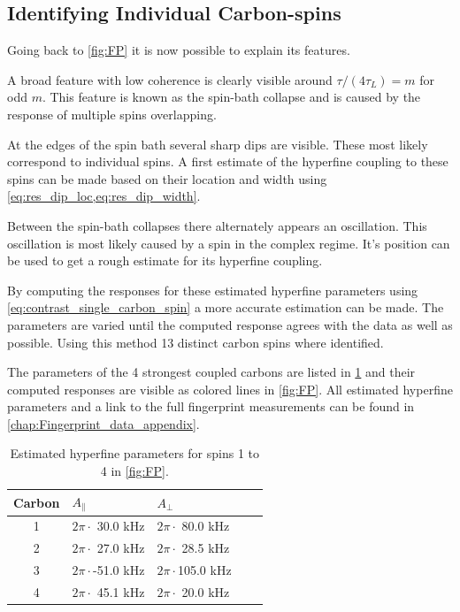 \subsection{Identifying Individual Carbon-spins}
Going back to \cref{fig:FP} it is now possible to explain its features.

A broad feature with low coherence is clearly visible around $\tau/(4\tau_L) = m$ for odd $m$.
This feature is known as the spin-bath collapse and is caused by the response of multiple spins overlapping.

At the edges of the spin bath several sharp dips are visible. These most likely correspond to individual spins.
A first estimate of the hyperfine coupling to these spins can be made based on their location and width using \cref{eq:res_dip_loc,eq:res_dip_width}.

Between the spin-bath collapses there alternately appears an oscillation.
This oscillation is most likely caused by a spin in the complex regime.
It's position can be used to get a rough estimate for its hyperfine coupling.

By computing the responses for these estimated hyperfine parameters using \cref{eq:contrast_single_carbon_spin} a more accurate estimation can be made.
The parameters are varied until the computed response agrees with the data as well as possible.
Using this method 13 distinct carbon spins where identified.

The parameters of the 4 strongest coupled carbons are listed in \cref{tbl:HF_par} and their computed responses are visible as colored lines in \cref{fig:FP}.
All estimated hyperfine parameters and a link to the full fingerprint measurements can be found in \cref{chap:Fingerprint_data_appendix}.

\begin{table}[htbp]
\centering
    \caption{Estimated hyperfine parameters for spins 1 to 4 in \cref{fig:FP}.}
    \begin{tabular}{cllll}
    Carbon & \quad \quad  $A_{\parallel} $ & \quad \quad $A_{\perp}$ \\ \hline
    1         & $2 \pi \cdot${ }30.0 kHz             & $2 \pi \cdot${ }80.0 kHz                \\
    2         & $2 \pi \cdot${ }27.0 kHz             & $2 \pi \cdot${ }28.5 kHz              \\
    3         & $2 \pi \cdot$-51.0 kHz          & $2 \pi \cdot$105.0 kHz              \\
    4         & $2 \pi \cdot${ }45.1 kHz           & $2 \pi \cdot${ }20.0 kHz                \\
    \end{tabular}
    \label{tbl:HF_par}
\end{table}

